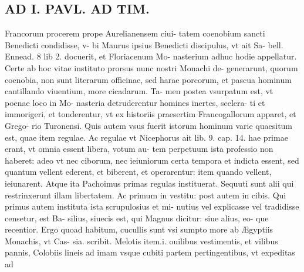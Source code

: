 \documentclass{article}
\begin{document}
\begin{pages}
\section*{AD I. PAVL. AD TIM. }
\marginpar{[ p.220 ]}\pstart Francorum procerem prope Aurelianensem ciui- tatem coenobium sancti Benedicti condidisse, v- bi Maurus ipsius Benedicti discipulus, vt ait Sa- bell. Ennead. 8 lib 2. docuerit, et Floriacenum Mo- nasterium adhuc hodie appellatur. Certe ab hoc vitae instituto prorsus nunc nostri Monachi de- generarunt, quorum coenobia, non sunt literarum officinae, sed harae porcorum, et pascua hominum cantillando viuentium, more cicadarum. Ta- men postea vsurpatum est, vt poenae loco in Mo- nasteria detruderentur homines inertes, scelera- ti et immorigeri, et tonderentur, vt ex historiis praesertim Francogallorum apparet, et Grego- rio Turonensi. Quis autem vsus fuerit istorum hominum varie quaesitum est, quae item regulae. Ac regulae vt Nicephorus ait lib. 9. cap. 14. hae primae erant, vt omnia essent libera, votum au- tem perpetuum ista professio non haberet: adeo vt nec ciborum, nec ieiuniorum certa tempora et indicta essent, sed quantum vellent ederent, et biberent, et operarentur: item quando vellent, ieiunarent. Atque ita Pachoimus primas regulas instituerat. Sequuti sunt alii qui restrinxerunt illam libertatem. Ac primum in vestitu: post autem in cibis. Qui primus autem instituta ista scrupulosius et mi- nutius vel explicasse vel tradidisse censetur, est Ba- silius, siuecis est, qui Magnus dicitur: siue alius, eo- que recentior. Ergo quoad habitum, cucullis sunt vsi sumpto more ab Ægyptiis Monachis, vt Cas- sia. scribit. Melotis item.i. ouilibus vestimentis, et vilibus pannis, Colobiis lineis ad imam vsque cubiti partem pertingentibus, vt expeditas ad  \pend

\end{pages}
\end{document}
